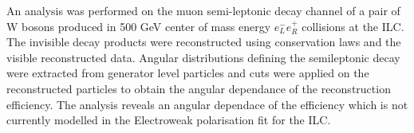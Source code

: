An analysis was performed on the muon semi-leptonic decay channel of a pair of W bosons produced in 500 GeV center of mass energy ${e}_{L}^{-}{e}_{R}^{+}$ collisions at the ILC. The invisible decay products were reconstructed using conservation laws and the visible reconstructed data. Angular distributions defining the semileptonic decay were extracted from generator level particles and cuts were applied on the reconstructed particles to obtain the angular dependance of the reconstruction efficiency. The analysis reveals an angular dependace of the efficiency which is not currently modelled in the Electroweak polarisation fit for the ILC. 
